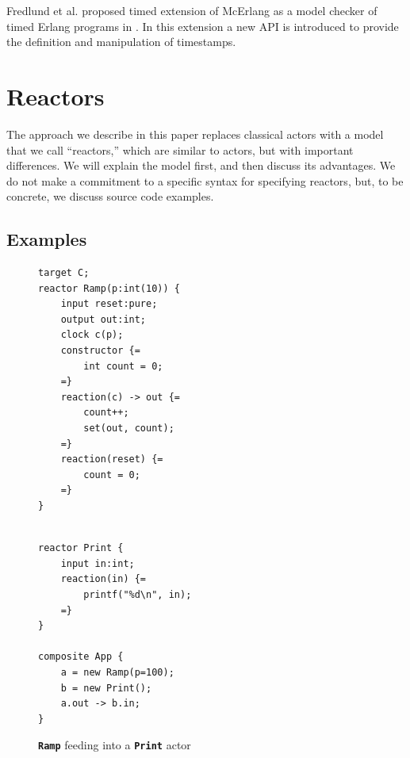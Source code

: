 \documentclass[sigconf]{acmart}
\newcommand{\todo}[1]{\mynote{TODO}{#1}{red}}
\newcommand{\keyword}[1]{\texttt{\textbf{#1}}}
\begin{document}
Fredlund et al. proposed timed extension of McErlang
as a model checker of timed Erlang programs in \cite{DBLP:conf/forte/EarleF12}. In this extension a new API is introduced to provide the definition and manipulation of timestamps.


\section{Reactors}

The approach we describe in this paper replaces classical actors with a model that we call ``reactors,''
which are similar to actors, but with important differences.
We will explain the model first, and then discuss its advantages.
We do not make a commitment to a specific syntax for specifying reactors,
but, to be concrete, we discuss source code examples.


\subsection{Examples}
\begin{figure}[ht]
\centering
\begin{minipage}{0.50\linewidth}
\begin{lstlisting}[language=LF]
target C;
reactor Ramp(p:int(10)) {
	input reset:pure;
	output out:int;
	clock c(p);
	constructor {=
		int count = 0;
	=}
	reaction(c) -> out {=
		count++;
		set(out, count);
	=}
	reaction(reset) {=
		count = 0;
	=}
}
\end{lstlisting}
\end{minipage}%
\begin{minipage}{0.45\linewidth}
\begin{lstlisting}[language=LF,firstnumber=13]

reactor Print {
	input in:int;
	reaction(in) {=
		printf("%d\n", in);
	=}
}

composite App {
	a = new Ramp(p=100);
	b = new Print();
	a.out -> b.in;
}
\end{lstlisting}
\end{minipage}
 \caption{\keyword{Ramp} feeding into a \keyword{Print} actor}
 \label{fig:code}
\end{figure}
\end{document}

